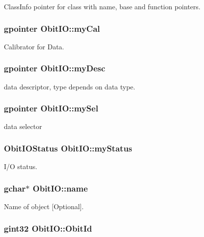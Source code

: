 Class\-Info pointer for class with name, base and function pointers. 

\subsubsection{\setlength{\rightskip}{0pt plus 5cm}gpointer {\bf Obit\-IO::my\-Cal}}\label{structObitIO_o8}


Calibrator for Data. 

\subsubsection{\setlength{\rightskip}{0pt plus 5cm}gpointer {\bf Obit\-IO::my\-Desc}}\label{structObitIO_o6}


data descriptor, type depends on data type. 

\subsubsection{\setlength{\rightskip}{0pt plus 5cm}gpointer {\bf Obit\-IO::my\-Sel}}\label{structObitIO_o7}


data selector 

\subsubsection{\setlength{\rightskip}{0pt plus 5cm}Obit\-IOStatus {\bf Obit\-IO::my\-Status}}\label{structObitIO_o5}


I/O status. 

\subsubsection{\setlength{\rightskip}{0pt plus 5cm}gchar$\ast$ {\bf Obit\-IO::name}}\label{structObitIO_o3}


Name of object [Optional]. 

\subsubsection{\setlength{\rightskip}{0pt plus 5cm}gint32 {\bf Obit\-IO::Obit\-Id}}\label{structObitIO_o0}


